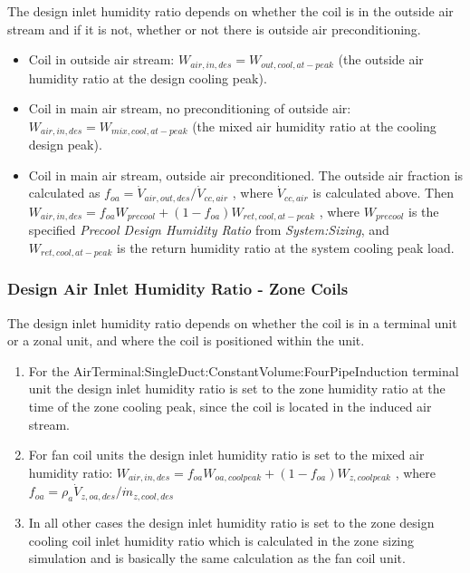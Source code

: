 The design inlet humidity ratio depends on whether the coil is in the outside air stream and if it is not, whether or not there is outside air preconditioning.

\begin{itemize}
\item
  Coil in outside air stream: \(W_{air,in,des} = W_{out,cool,at-peak}\) (the outside air humidity ratio at the design cooling peak).
\item
  Coil in main air stream, no preconditioning of outside air: \(W_{air,in,des} = W_{mix,cool,at-peak}\) (the mixed air humidity ratio at the cooling design peak).
\item
  Coil in main air stream, outside air preconditioned. The outside air fraction is calculated as \(f_{oa} = \dot V_{air,out,des}/\dot V_{cc,air}\) , where \(\dot V_{cc,air}\) is calculated above. Then \(W_{air,in,des} = f_{oa}W_{precool}+\left(1-f_{oa}\right)W_{ret,cool,at-peak}\) , where \(W_{precool}\) is the specified \emph{Precool Design Humidity Ratio} from \emph{System:Sizing}, and \(W_{ret,cool,at-peak}\) is the return humidity ratio at the system cooling peak load.
\end{itemize}

\subsubsection{Design Air Inlet Humidity Ratio - Zone Coils}\label{design-air-inlet-humidity-ratio---zone-coils}

The design inlet humidity ratio depends on whether the coil is in a terminal unit or a zonal unit, and where the coil is positioned within the unit.

\begin{enumerate}
\def\labelenumi{\arabic{enumi}.}
\item
  For the AirTerminal:SingleDuct:ConstantVolume:FourPipeInduction terminal unit the design inlet humidity ratio is set to the zone humidity ratio at the time of the zone cooling peak, since the coil is located in the induced air stream.
\item
  For fan coil units the design inlet humidity ratio is set to the mixed air humidity ratio: \(W_{air,in,des} = f_{oa}W_{oa,coolpeak} + \left(1-f_{oa}\right)W_{z,coolpeak}\) , where \(f_{oa} = \rho_a \dot V_{z,oa,des} / \dot m_{z,cool,des}\)
\item
  In all other cases the design inlet humidity ratio is set to the zone design cooling coil inlet humidity ratio which is calculated in the zone sizing simulation and is basically the same calculation as the fan coil unit.
\end{enumerate}

